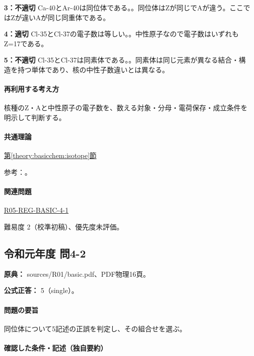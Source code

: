 \noindent\textbf{3：不適切} Ca-40とAr-40は同位体である。。同位体はZが同じでAが違う。ここではZが違いAが同じ同重体である。\par

\noindent\textbf{4：適切} Cl-35とCl-37の電子数は等しい。。中性原子なので電子数はいずれもZ=\allowbreak{}17である。\par

\noindent\textbf{5：不適切} Cl-35とCl-37は同素体である。。同素体は同じ元素が異なる結合・構造を持つ単体であり、核の中性子数違いとは異なる。\par

\paragraph{再利用する考え方} 核種のZ・Aと中性原子の電子数を、数える対象・分母・電荷保存・成立条件を明示して判断する。

\paragraph{共通理論} \hyperref[theory:basicchem:isotope]{第\ref*{theory:basicchem:isotope}節}

\par 参考：\cite{iupac_isotopes}。

\paragraph{関連問題} \hyperref[q:r05-reg-basic-4-1]{R05-REG-BASIC-4-1}

\par 難易度 2（校準初稿）、優先度未評価。

\subsection{令和元年度 問4-2}
\label{q:r01-reg-basic-4-2}

\noindent\textbf{原典：} sources/R01/basic.pdf、PDF物理16頁。

\textbf{公式正答：} 5（single）。

\paragraph{問題の要旨} 同位体について5記述の正誤を判定し、その組合せを選ぶ。

\paragraph{確認した条件・記述（独自要約）}\mbox{}\par

